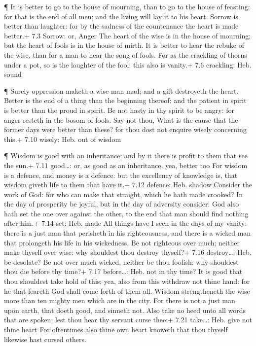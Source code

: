  ¶ It is better to go to the house of mourning, than to go
to the house of feasting: for that is the end of all men; and the living
will lay it to his heart.  Sorrow is better than laughter:
for by the sadness of the countenance the heart is made better.+ 7.3
Sorrow: or, Anger  The heart of the wise is in the house of
mourning; but the heart of fools is in the house of mirth. 
It is better to hear the rebuke of the wise, than for a man to hear the
song of fools.  For as the crackling of thorns under a pot,
so is the laughter of the fool: this also is vanity.+ 7.6 crackling:
Heb. sound

 ¶ Surely oppression maketh a wise man mad; and a gift
destroyeth the heart.  Better is the end of a thing than the
beginning thereof: and the patient in spirit is better than the proud in
spirit.  Be not hasty in thy spirit to be angry: for anger
resteth in the bosom of fools.  Say not thou, What is the
cause that the former days were better than these? for thou dost not
enquire wisely concerning this.+ 7.10 wisely: Heb. out of wisdom

 ¶ Wisdom is good with an inheritance: and by it there is
profit to them that see the sun.+ 7.11 good\ldots: or, as good as an
inheritance, yea, better too  For wisdom is a defence, and
money is a defence: but the excellency of knowledge is, that wisdom
giveth life to them that have it.+ 7.12 defence: Heb. shadow
 Consider the work of God: for who can make that straight,
which he hath made crooked?  In the day of prosperity be
joyful, but in the day of adversity consider: God also hath set the one
over against the other, to the end that man should find nothing after
him.+ 7.14 set: Heb. made  All things have I seen in the
days of my vanity: there is a just man that perisheth in his
righteousness, and there is a wicked man that prolongeth his life in his
wickedness.  Be not righteous over much; neither make
thyself over wise: why shouldest thou destroy thyself?+ 7.16
destroy\ldots: Heb. be desolate?  Be not over much wicked,
neither be thou foolish: why shouldest thou die before thy time?+ 7.17
before\ldots: Heb. not in thy time?  It is good that thou
shouldest take hold of this; yea, also from this withdraw not thine
hand: for he that feareth God shall come forth of them all.
 Wisdom strengtheneth the wise more than ten mighty men
which are in the city.  For there is not a just man upon
earth, that doeth good, and sinneth not.  Also take no heed
unto all words that are spoken; lest thou hear thy servant curse thee:+
7.21 take\ldots: Heb. give not thine heart  For oftentimes
also thine own heart knoweth that thou thyself likewise hast cursed
others.

